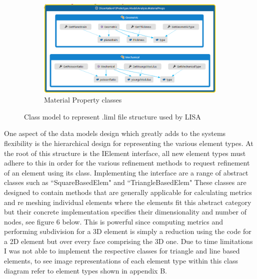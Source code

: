 \begin{figure}[H]
\begin{subfigure}{.5\textwidth}
  \label{fig:sub1}
\end{subfigure}%
\begin{subfigure}{.5\textwidth}
  \centering
  \includegraphics[width=0.9\linewidth]{../Graphics/DataModelStructure/MaterialProps.png}
  \caption{Material Property classes}
  \label{fig:sub2}
\end{subfigure}
\label{fig:test}
\caption{Class model to represent .liml file structure used by LISA}
\end{figure}


\noindent
One aspect of the data models design which greatly adds to the systems flexibility is the hierarchical design for representing the various element types. At the root of this structure is the IElement interface, all new element types must adhere to this in order for the various refinement methods to request refinement of an element using its class. Implementing the interface are a range of abstract classes such as ``SquareBasedElem" and ``TriangleBasedElem" These classes are designed to contain methods that are generally applicable for calculating metrics and re meshing individual elements where the elements fit this abstract category but their concrete implementation specifies their dimensionality and number of nodes, see figure 6 below. This is powerful since computing metrics and performing subdivision for a 3D element is simply a reduction using the code for a 2D element but over every face comprising the 3D one. Due to time limitations I was not able to implement the respective classes for triangle and line based elements, to see image representations of each element type within this class diagram refer to element types shown in appendix B.\\ 


